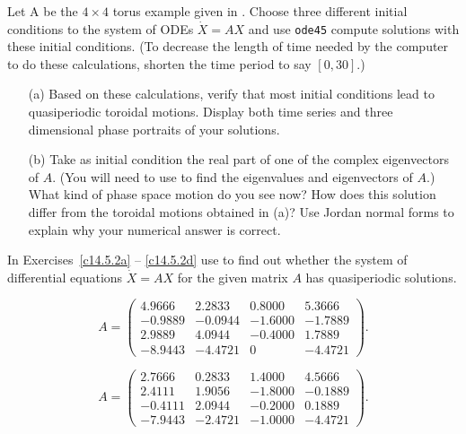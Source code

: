 \begin{exercise}  \label{EX:tor4}
Let A be the $4\times 4$ torus example given in .  Choose three 
different initial conditions to the system of ODEs $\dot{X}=AX$ and use 
{\tt ode45} compute solutions with these initial conditions.  (To decrease 
the length of time needed by the computer to do these calculations, shorten 
the time period to say $[0,30]$.)  
\begin{itemize}
\item[(a)]  Based on these calculations, verify that most initial conditions 
lead to quasiperiodic toroidal motions.  Display both time series and 
three dimensional phase portraits of your solutions. 
\item[(b)]  Take as initial condition the real part of one of the complex
eigenvectors of $A$.  (You will need to use \Matlab to find the eigenvalues
and eigenvectors of $A$.)  What kind of phase space motion do you see now? 
How does this solution differ from the toroidal motions obtained in (a)? 
Use Jordan normal forms to explain why your numerical answer is correct.
\end{itemize}
\end{exercise} 

\noindent In Exercises~\ref{c14.5.2a} -- \ref{c14.5.2d} use \Matlab to find
out whether the system of differential equations $\dot X= AX$ for
the given matrix $A$ has quasiperiodic solutions.
\begin{exercise} \label{c14.5.2a}
\begin{equation*}
A=\left(\begin{array}{rrrr}
    4.9666  &  2.2833  &  0.8000  &  5.3666\\
   -0.9889  & -0.0944  & -1.6000  & -1.7889\\
    2.9889  &  4.0944  & -0.4000  &  1.7889\\
   -8.9443  & -4.4721  &       0  & -4.4721
\end{array}\right).
\end{equation*}
\end{exercise}

\begin{exercise} \label{c14.5.2b}
\begin{equation*}
A=\left(\begin{array}{rrrr}
    2.7666  &  0.2833  &  1.4000  &  4.5666\\
    2.4111  &  1.9056  & -1.8000  & -0.1889\\
   -0.4111  &  2.0944  & -0.2000  &  0.1889\\
   -7.9443  & -2.4721  & -1.0000  & -4.4721
\end{array}\right).
\end{equation*}
\end{exercise}

